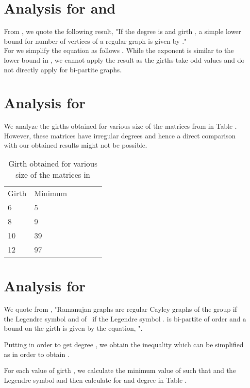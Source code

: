 \documentclass{llncs}
\begin{document}
\section {Analysis for   and  }

From , we quote the following result, 
"If the degree is   and girth  , a simple lower bound for number of vertices of a regular graph is given by ." \\ For   we simplify the equation as follows  . While the exponent is similar to the lower bound in  , we cannot apply the result as the girths take odd values and do not directly apply for bi-partite graphs. 

\section {Analysis for  }

We analyze the girths obtained for various size of the matrices from  in Table . However, these matrices have irregular degrees and hence a direct comparison with our obtained results might not be possible.

\begin{table}
\caption{Girth obtained for various size of the matrices in  }
\begin{tabular}{llllll}
\hline\noalign{\smallskip}
Girth & Minimum  \\
\noalign{\smallskip}
\hline
\noalign{\smallskip}
6 & 5\\
8 & 9\\
10 & 39\\
12 & 97\\
\hline
\end{tabular}
\end{table} 

\section {Analysis for   }

We quote from , "Ramanujan graphs  {are }  regular Cayley graphs of the group  if the Legendre symbol  and of \   {if the Legendre symbol }  .  is bi-partite of order   and a bound on the girth is given by the equation, ".

Putting  in order to get degree , we obtain the inequality  which can be simplified as  in order to obtain .

For each value of girth , we calculate the minimum value of  such that  and the Legendre symbol   and then calculate  for  and degree  in Table .
\end{document}
